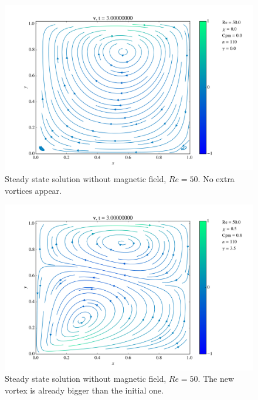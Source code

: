 \documentclass[journal]{IEEEtran}
\begin{document}
\begin{figure}[!t]
\centering
\includegraphics[width=\linewidth]{figures/Re050/n/vectorField}
\caption{Steady state solution without magnetic field, $\mathit{Re}=50$. No extra vortices appear. \label{Re050nVectorField}}
\end{figure}

\begin{figure}[!t]
\centering
\includegraphics[width=\linewidth]{figures/Re050/w/vectorField}
\caption{Steady state solution without magnetic field, $\mathit{Re}=50$. The new vortex is already bigger than the initial one. \label{Re050wVectorField}}
\end{figure}
\end{document}
